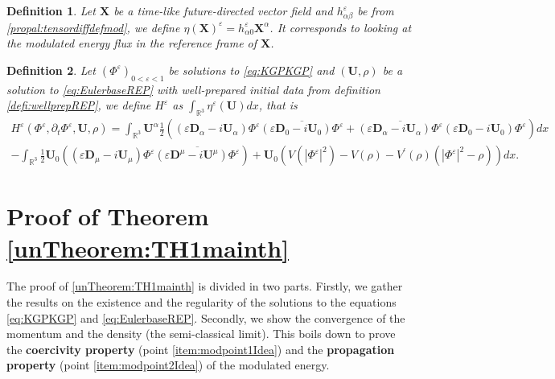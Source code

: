 \documentclass[a4paper, 15pt]{article}
\numberwithin{equation}{section}
\newtheorem{defi}{Definition}[section]
\begin{document}
\begin{defi}
\label{defi:etadefmod}
    Let $\textbf{X}$ be a time-like future-directed vector field and $h^\varepsilon_{\alpha\beta}$ be from \ref{propal:tensordiffdefmod}, we define $\eta(\textbf{X})^\varepsilon=h^\varepsilon_{\alpha0}\textbf{X}^\alpha$. It corresponds to looking at the modulated energy flux in the reference frame of $\textbf{X}$.\\
    \end{defi}
\begin{defi}
\label{defi:hdefintegralhdef}
    Let $(\Phi^\varepsilon)_{0<\varepsilon<1}$ be solutions to \eqref{eq:KGPKGP} and $(\textbf{U},\rho)$ be a solution to \eqref{eq:EulerbaseREP} with well-prepared initial data from definition \ref{defi:wellprepREP}, we define $H^\varepsilon$ as $\int_{\mathbb{R}^3}{\eta^\varepsilon(\textbf{U})dx}$, that is 
    \begin{align*}
    \label{eq:Hepsfulldefmod}
    H^\varepsilon(\Phi^\varepsilon,\partial_t\Phi^\varepsilon,\textbf{U},\rho)=\int_{\mathbb{R}^3}{\textbf{U}^\alpha\frac{1}{2}((\varepsilon\textbf{D}_\alpha-i\textbf{U}_\alpha)\Phi^\varepsilon\overline{(\varepsilon\textbf{D}_0-i\textbf{U}_0)\Phi^\varepsilon}+\overline{(\varepsilon\textbf{D}_\alpha-i\textbf{U}_\alpha)\Phi^\varepsilon}(\varepsilon\textbf{D}_0-i\textbf{U}_0)\Phi^\varepsilon)dx}\\
    -\int_{\mathbb{R}^3}{\frac{1}{2}\textbf{U}_0((\varepsilon\textbf{D}_\mu-i\textbf{U}_\mu)\Phi^\varepsilon\overline{(\varepsilon\textbf{D}^\mu-i\textbf{U}^\mu )\Phi^\varepsilon})+\textbf{U}_0(V(|\Phi^\varepsilon|^2)-V(\rho)-V^{\prime}(\rho)(|\Phi^\varepsilon|^2-\rho))dx}.
    \end{align*}
\end{defi}
\section{Proof of Theorem \ref{unTheorem:TH1mainth}}
\label{section:Proof}
The proof of \ref{unTheorem:TH1mainth} is divided in two parts. Firstly, we gather the results on the existence and the regularity of the solutions to the equations \eqref{eq:KGPKGP} and \eqref{eq:EulerbaseREP}. Secondly, we show the convergence of the momentum and the density (the semi-classical limit). This boils down to prove the \textbf{coercivity property} (point \ref{item:modpoint1Idea}) and the \textbf{propagation property} (point \ref{item:modpoint2Idea}) of the modulated energy.
\end{document}
